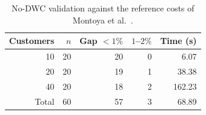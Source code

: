\begin{table}[!t]
\centering
\footnotesize
\caption{No-DWC validation against the reference costs of Montoya et al.~\cite{montoya2017electric}.}
\label{tab:validation}
\setlength{\tabcolsep}{3pt}
\renewcommand{\arraystretch}{1.12}
\begin{tabular}{rrrrr}
\toprule
Customers & $n$ & Gap $<1\%$ & $1$--$2\%$ & Time (s) \\
\midrule
10 & 20 & 20 & 0 & 6.07 \\
20 & 20 & 19 & 1 & 38.38 \\
40 & 20 & 18 & 2 & 162.23 \\
Total & 60 & 57 & 3 & 68.89 \\
\bottomrule
\end{tabular}
\end{table}
